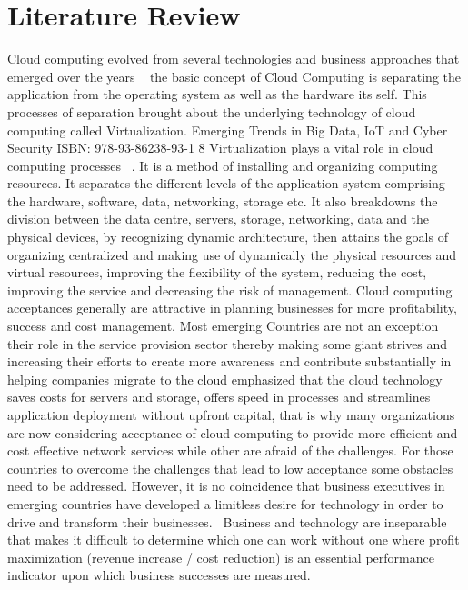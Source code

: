 \documentclass[conference]{IEEEtran}
\begin{document}
\section{Literature Review}
Cloud computing evolved from several technologies and
business approaches that emerged over the years ~\cite{3} the basic
concept of Cloud Computing is separating the application from
the operating system as well as the hardware its self. This
processes of separation brought about the underlying
technology of cloud computing called Virtualization.
Emerging Trends in Big Data, IoT and Cyber Security
ISBN: 978-93-86238-93-1 8
Virtualization plays a vital role in cloud computing processes
~\cite{4}. It is a method of installing and organizing computing
resources. It separates the different levels of the application
system comprising the hardware, software, data, networking,
storage etc. It also breakdowns the division between the data
centre, servers, storage, networking, data and the physical
devices, by recognizing dynamic architecture, then attains the
goals of organizing centralized and making use of dynamically
the physical resources and virtual resources, improving the
flexibility of the system, reducing the cost, improving the
service and decreasing the risk of management. Cloud
computing acceptances generally are attractive in planning
businesses for more profitability, success and cost
management. Most emerging Countries are not an exception
their role in the service provision sector thereby making some
giant strives and increasing their efforts to create more
awareness and contribute substantially in helping companies
migrate to the cloud emphasized that the cloud technology
saves costs for servers and storage, offers speed in processes
and streamlines application deployment without upfront
capital, that is why many organizations are now considering
acceptance of cloud computing to provide more efficient and
cost effective network services while other are afraid of the
challenges. For those countries to overcome the challenges that
lead to low acceptance some obstacles need to be addressed.
However, it is no coincidence that business executives in
emerging countries have developed a limitless desire for
technology in order to drive and transform their businesses.
~\cite{5}Business and technology are inseparable that makes it
difficult to determine which one can work without one where
profit maximization (revenue increase / cost reduction) is an
essential performance indicator upon which business successes
are measured.
\end{document}
